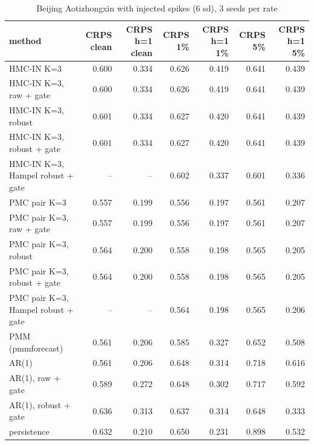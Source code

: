 \begin{table}[ht]\centering\small
\caption{Beijing Aotizhongxin with injected spikes (6 sd), 3 seeds per rate}
\begin{tabular}{lrrrrrr}
\hline
method & CRPS clean & CRPS h=1 clean & CRPS 1\% & CRPS h=1 1\% & CRPS 5\% & CRPS h=1 5\% \\ \hline
HMC-IN K=3 & 0.600 & 0.334 & 0.626 & 0.419 & 0.641 & 0.439 \\
HMC-IN K=3, raw + gate & 0.600 & 0.334 & 0.626 & 0.419 & 0.641 & 0.439 \\
HMC-IN K=3, robust & 0.601 & 0.334 & 0.627 & 0.420 & 0.641 & 0.439 \\
HMC-IN K=3, robust + gate & 0.601 & 0.334 & 0.627 & 0.420 & 0.641 & 0.439 \\
HMC-IN K=3, Hampel robust + gate & – & – & 0.602 & 0.337 & 0.601 & 0.336 \\
PMC pair K=3 & 0.557 & 0.199 & 0.556 & 0.197 & 0.561 & 0.207 \\
PMC pair K=3, raw + gate & 0.557 & 0.199 & 0.556 & 0.197 & 0.561 & 0.207 \\
PMC pair K=3, robust & 0.564 & 0.200 & 0.558 & 0.198 & 0.565 & 0.205 \\
PMC pair K=3, robust + gate & 0.564 & 0.200 & 0.558 & 0.198 & 0.565 & 0.205 \\
PMC pair K=3, Hampel robust + gate & – & – & 0.564 & 0.198 & 0.565 & 0.206 \\
PMM (pmmforecast) & 0.561 & 0.206 & 0.585 & 0.327 & 0.652 & 0.508 \\
AR(1) & 0.561 & 0.206 & 0.648 & 0.314 & 0.718 & 0.616 \\
AR(1), raw + gate & 0.589 & 0.272 & 0.648 & 0.302 & 0.717 & 0.592 \\
AR(1), robust + gate & 0.636 & 0.313 & 0.637 & 0.314 & 0.648 & 0.333 \\
persistence & 0.632 & 0.210 & 0.650 & 0.231 & 0.898 & 0.532 \\
\hline\end{tabular}\end{table}

